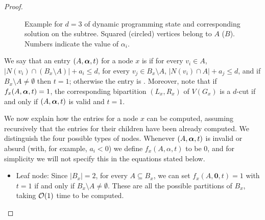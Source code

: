 \begin{proof}
\begin{figure}[!htb]
\begin{tikzpicture}[rotate = 90]
        \end{tikzpicture}
        \caption{Example for $d=3$ of dynamic programming state and corresponding solution on the subtree. Squared (circled) vertices belong to $A$ ($B$). Numbers indicate the value of $\alpha_i$.\label{fig:treewidth}}
    \end{figure}

    We say that an entry $(A, \balpha, t)$ for a node $x$ is  if for every $v_i \in A$, $|N(v_i) \cap (B_x \setminus A)| + a_i \leq d$, for every $v_j \in B_x \setminus A$, $|N(v_i) \cap A| + a_j \leq d$, and if $B_x \setminus A \neq \emptyset$ then $t = 1$; otherwise the entry is . Moreover, note that if $f_x(A, \balpha, t)=1$, the corresponding bipartition $(L_x,R_x)$ of $V(G_x)$ is a $d$-cut if and only if $(A, \balpha, t)$ is valid and $t = 1$.


    We now explain how the entries for a node $x$ can be computed, assuming recursively that the entries for their children have been already computed. We distinguish the four possible types of nodes. Whenever $(A, \balpha, t)$ is invalid or absurd (with, for example, $a_i < 0$) we define $f_x(A, \alpha, t)$ to be $0$, and for simplicity we will not specify this in the equations stated below.

    \begin{itemize}
        \item Leaf node: Since $|B_x| = 2$, for every $A \subseteq B_x$, we can set $f_x(A, \boldsymbol{0}, t) = 1$ with $t = 1$ if and only if $B_x \setminus A \neq \emptyset$.
        These are all the possible partitions of $B_x$, taking $\bigO{1}$ time to be computed.


\end{itemize}
\end{proof}
